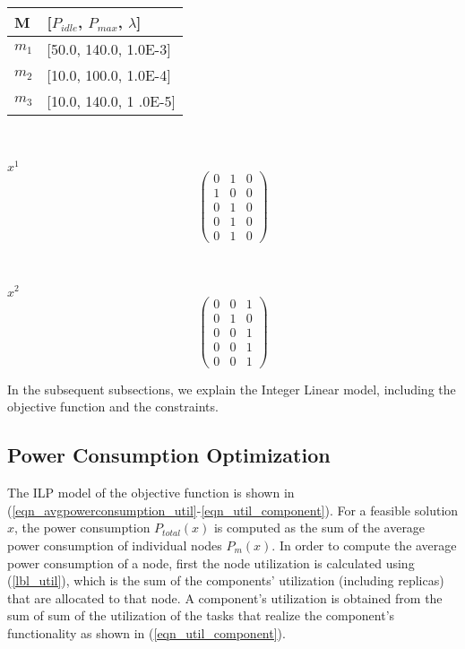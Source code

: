\begin{minipage}{.5\columnwidth}%
\centering
\begin{tabular}{@{}ll@{}}
\toprule
M  & {[}$P_{idle}$, $P_{max}$, $\lambda${]} \\ \midrule
$m_1$ & {[}50.0, 140.0, 1.0E-3{]}  \\
$m_2$ & {[}10.0, 100.0, 1.0E-4{]}  \\
$m_3$ & {[}10.0, 140.0, 1 .0E-5{]}  \\ \bottomrule
\end{tabular}
\label{tbl_nodes_config}
\end{minipage}~
\begin{minipage}{.4\columnwidth}
\begin{minipage}{.5\columnwidth}
\centering
$x^{1}$
 $$
\begin{pmatrix} 
0 & 1 & 0\\
1 & 0 & 0\\
0 & 1 & 0\\
0 & 1 & 0\\
0 & 1 & 0
\end{pmatrix}
$$
\end{minipage}~
\begin{minipage}{0.5\columnwidth}
\centering
$x^{2}$
$$
\begin{pmatrix} 
0 & 0 & 1\\
0 & 1 & 0\\
0 & 0 & 1\\
0 & 0 & 1\\
0 & 0 & 1
\end{pmatrix}
$$
\end{minipage}
\label{fig_matrix_feasible_solution}
\end{minipage}

In the subsequent subsections, we explain the Integer Linear model, including the objective function and the constraints.

\subsection{Power Consumption Optimization }
The ILP model of the objective function is shown in (\ref{eqn_avgpowerconsumption_util}-\ref{eqn_util_component}). For a feasible solution $x$, the power consumption $P_{total}(x)$ is computed as the sum of the average power consumption of individual nodes $P_m(x)$. In order to compute the average power consumption of a node, first the node utilization is calculated using (\ref{lbl_util}), which is the sum of the components' utilization (including replicas) that are allocated to that node. A component's utilization is obtained from the sum of sum of the utilization of the tasks that realize the component's functionality as shown in (\ref{eqn_util_component}).

